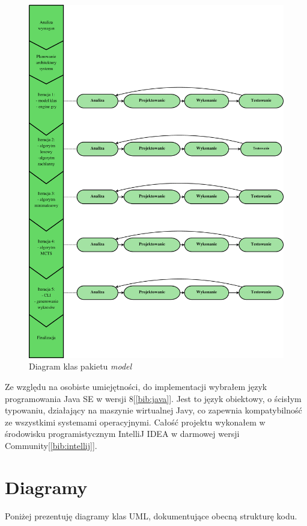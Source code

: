 \clearpage
\begin{figure}[H]
	\centering
	\includegraphics[width=\textwidth]{Resources/diagramIteracje.eps}
	\caption{Diagram klas pakietu \textit{model}} 
	\label{fig:diagramIteracji}
\end{figure}

Ze względu na osobiste umiejętności, do implementacji wybrałem język programowania Java SE w wersji 8[\ref{bib:java}]. Jest to język obiektowy, o ścisłym typowaniu, działający na maszynie wirtualnej Javy, co zapewnia kompatybilność ze wszystkimi systemami operacyjnymi. Całość projektu wykonałem w środowisku programistycznym IntelliJ IDEA w darmowej wersji Community[\ref{bib:intellij}].

\clearpage
\section{Diagramy}
Poniżej prezentuję diagramy klas UML, dokumentujące obecną strukturę kodu. 
